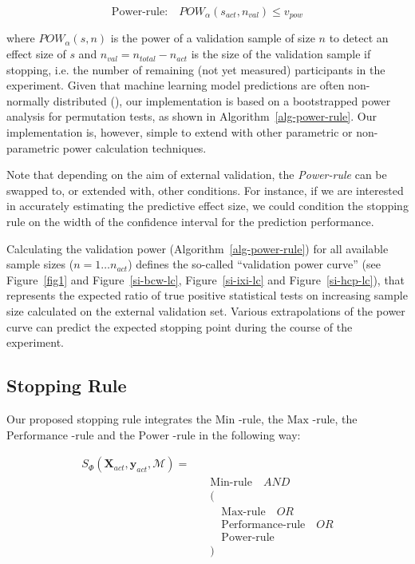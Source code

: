 \documentclass{article}
\begin{document}
\begin{equation}
\label{eq-pow}
    \text{Power-rule:} \quad POW_\alpha(s_{act}, n_{val}) \leq v_{pow}
\end{equation}

where $POW_\alpha(s, n)$ is the power of a validation sample of size $n$ to detect an effect size of $s$ and $n_{val} = n_{total} -n_{act}$ is the size of the validation sample if stopping, i.e. the number of remaining (not yet measured) participants in the experiment.
Given that machine learning model predictions are often non-normally distributed (\cite{Spisak_2022}), our implementation is based on a bootstrapped power analysis for permutation tests, as shown in Algorithm~\ref{alg-power-rule}. Our implementation is, however, simple to extend with other parametric or non-parametric power calculation techniques.

Note that depending on the aim of external validation, the \textit{Power-rule} can be swapped to, or extended with, other conditions. For instance, if we are interested in accurately estimating the predictive effect size, we could condition the stopping rule on the width of the confidence interval for the prediction performance.

Calculating the validation power (Algorithm~\ref{alg-power-rule}) for all available sample sizes ($n = 1 \dots n_{act}$) defines the so-called ``validation power curve'' (see Figure~\ref{fig1} and Figure~\ref{si-bcw-lc}, Figure~\ref{si-ixi-lc} and Figure~\ref{si-hcp-lc}), that represents the expected ratio of true positive statistical tests on increasing sample size calculated on the external validation set. Various extrapolations of the power curve can predict the expected stopping point during the course of the experiment.

\subsection{Stopping Rule}

Our proposed stopping rule integrates the $\text{Min -rule}$, the $\text{Max -rule}$, the $\text{Performance -rule}$ and the $\text{Power -rule}$ in the following way:

\begin{equation}
\begin{split}
     S_\Phi(\mathbf{X}_{act}, \mathbf{y}_{act}, \mathcal{M}) = \quad & \\ 
    &\text{Min-rule} \quad AND \\
    & ( \\
    & \quad \text{Max-rule} \quad OR \\
    & \quad\text{Performance-rule} \quad OR \\
    & \quad \text{Power-rule} \\
    &)
    \end{split}
\end{equation}
\end{document}
